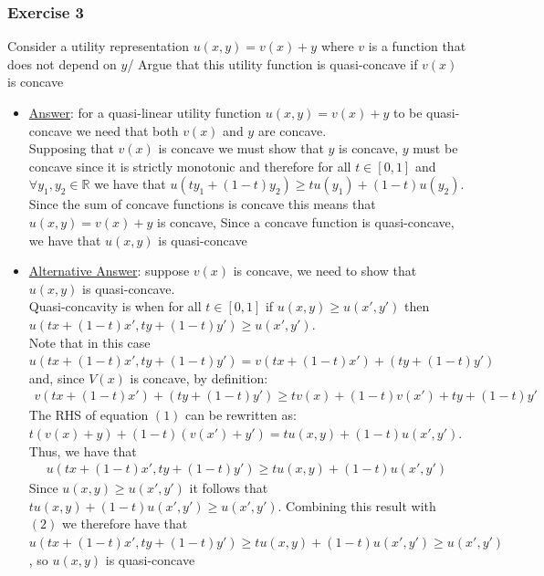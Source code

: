 \documentclass{article}
\begin{document}
\par
\vspace{6mm}
\subsubsection{Exercise 3}
Consider a utility representation $u(x,y) = v(x) + y$ where $v$ is a function that does not depend on $y$/ Argue that this utility function is quasi-concave if $v(x)$ is concave\par \vspace{0.3em}
\begin{itemize}
  \item  \underline{Answer}: for a quasi-linear utility function $u(x,y) = v(x) + y$ to be quasi-concave we need that both $v(x)$ and $y$ are concave.\\ Supposing that $v(x)$ is concave we must show that $y$ is concave, $y$ must be concave since it is strictly monotonic and therefore for all $t \in [0,1]$ and $\forall y_{1},y_{2} \in \mathbb{R}$ we have that $u(ty_{1} + (1-t)y_{2}) \geq tu(y_{1}) + (1-t)u(y_{2})$.\\ Since the sum of concave functions is concave this means that $u(x,y) = v(x) + y$ is concave, Since a concave function is quasi-concave, we have that $u(x,y)$ is quasi-concave
  \item  \underline{Alternative Answer}: suppose $v(x)$ is concave, we need to show that $u(x,y)$ is quasi-concave.\\ Quasi-concavity is when for all $t \in [0,1]$ if $u(x,y) \geq u(x',y')$ then $u(tx + (1-t)x', ty + (1-t)y') \geq u(x', y')$.\\ Note that in this case $u(tx + (1-t)x', ty + (1-t)y') = v(tx + (1-t)x') + (ty + (1-t)y')$ and, since $V(x)$ is concave, by definition:
  \begin{gather*}
    v(tx + (1-t)x') + (ty + (1-t)y') \geq tv(x) + (1-t) v(x') + ty + (1-t)y' \ \tag{1}
  \end{gather*}
  The RHS of equation $(1)$ can be rewritten as: $t(v(x) + y) + (1-t)(v(x')+y') = tu(x,y) + (1-t)u(x',y')$. Thus, we have that
  \begin{gather*}
    u(tx + (1-t)x', ty + (1-t)y') \geq tu(x,y) + (1-t)u(x',y') \ \tag{2}
  \end{gather*}
  Since $u(x,y) \geq u(x',y')$ it follows that $tu(x,y) + (1-t)u(x',y') \geq u(x',y')$. Combining this result with $(2)$ we therefore have that $u(tx + (1-t)x', ty + (1-t)y') \geq tu(x,y) + (1-t)u(x',y') \geq u(x', y')$, so $u(x,y)$ is quasi-concave
\end{itemize}
\par
\vspace{6mm}
\end{document}
